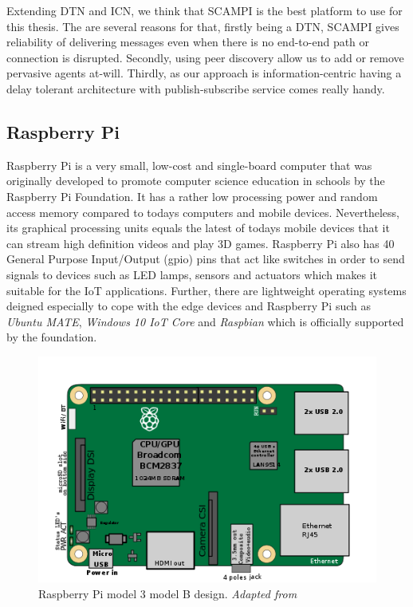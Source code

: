 \noindent Extending DTN and ICN, we think that SCAMPI is the best platform to use for this thesis. The are several reasons for that, firstly being a DTN, SCAMPI gives reliability of delivering messages even when there is no end-to-end path or connection is disrupted. Secondly, using peer discovery allow us to add or remove pervasive agents at-will. Thirdly, as our approach is information-centric having a delay tolerant architecture with publish-subscribe service comes really handy. 



\subsection{Raspberry Pi}
Raspberry Pi is a very small, low-cost and single-board computer that was originally developed to promote computer science education in schools by the Raspberry Pi Foundation. It has a rather low processing power and random access memory compared to todays computers and mobile devices. Nevertheless, its graphical processing units equals the latest of todays mobile devices that it can stream high definition videos and play 3D games. Raspberry Pi also has 40 General Purpose Input/Output (gpio) pins that act like switches in order to send signals to devices such as LED lamps, sensors and actuators which makes it suitable for the IoT applications. Further, there are lightweight operating systems deigned especially to cope with the edge devices and Raspberry Pi  such as \textit{Ubuntu MATE},  \textit{Windows 10 IoT Core} and \textit{Raspbian} which is officially supported by the foundation.
\begin{figure}[H]
	\centering
	\includegraphics[scale=0.5]{images/rpi.png}
	\caption{Raspberry Pi model 3 model B design. \textit{Adapted from \cite{RASPI}}}
	\label{fig:rpi}
\end{figure}

